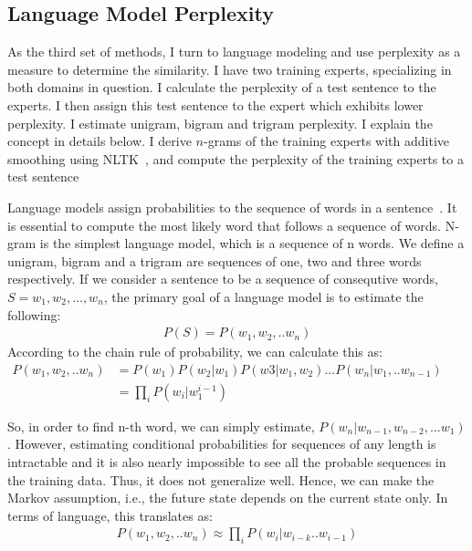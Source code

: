 \subsection{Language Model Perplexity} 

As the third set of methods, I turn to language modeling and use perplexity as a measure to determine the similarity. I have two training experts, specializing in both domains in question. I calculate the perplexity of a test sentence to the experts. I then assign this test sentence to the expert which exhibits lower perplexity. I estimate unigram, bigram and trigram perplexity. I explain the concept in details below. I derive $n$-grams  of the training experts with additive smoothing using NLTK~\citep{loper2002nltk}, and compute the perplexity of the training experts to a test sentence

Language models assign probabilities to the sequence of words in a sentence~\citep{jurafsky2014speech}. It is essential to compute the most likely word that follows a sequence of words. N-gram is the simplest language model, which is a sequence of n words. We define a unigram, bigram and a trigram are sequences of one, two and three words respectively. If we consider a sentence to be a sequence of consequtive words,  $S = {w_1,w_2,...,w_n}$, the primary goal of a language model is to estimate the following:
\begin{align}
    P(S) = P(w_1,w_2,..w_n)
\end{align}
According to the chain rule of probability, we can calculate this as:
\begin{equation}
    \begin{aligned}
        P(w_1,w_2,..w_n) &= P(w_1)P(w_2|w_1)P(w3|w_1,w_2) ... P(w_n|w_1,..w_{n-1})&&\\
     &= \prod_i P(w_i|w_{1}^{i-1})&&
    \end{aligned}
\end{equation}

So, in order to find n-th word, we can simply estimate, $P(w_n|w_{n-1}, w_{n-2}, ... w_1)$. However, estimating conditional probabilities for sequences of any length is intractable and it is also nearly impossible to see all the probable sequences in the training data. Thus, it does not generalize well. Hence, we can make the Markov assumption, i.e., the future state depends on the current state only. In terms of language, this translates as:
\begin{align}
    P(w_1,w_2,..w_n) \approx \prod_i P(w_i|w_{i-k}..w_{i-1})
\end{align}

